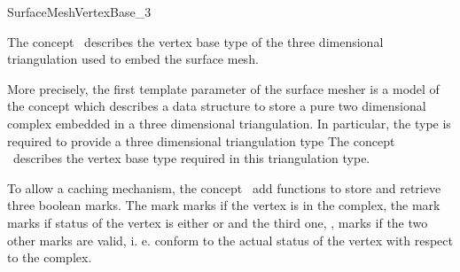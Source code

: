 

\begin{ccRefConcept}{SurfaceMeshVertexBase_3}


\ccDefinition
  
The concept \ccRefName\ describes the vertex base type
of the three dimensional triangulation used
to embed the surface mesh.

More precisely,
the first template parameter  of the surface mesher
is a model of the concept 
which describes a data structure to store
a pure two dimensional complex 
embedded in a three dimensional triangulation.
In particular, the type  is required to provide
a three dimensional triangulation type
The concept \ccRefName\ describes the vertex base type
required in this triangulation type.





\ccGeneralizes



To allow a caching mechanism, 
the concept \ccRefName\ 
add functions to store and retrieve three boolean marks.
The mark  marks if the vertex is in the complex,
the mark \ccc{regular_or_boundary_mark} marks if 
status of the vertex is either  or 
and the third one, , marks if the two other
marks are valid, i. e. conform to the actual status of the vertex with
respect to the complex.





\ccCreation
{}  %


\ccOperations


\end{ccRefConcept}

